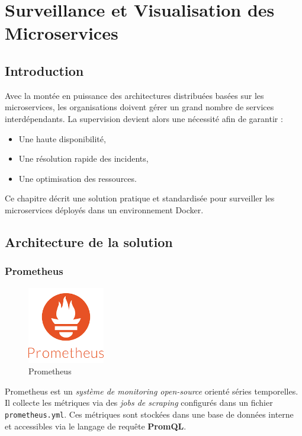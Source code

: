 \chapter{Surveillance et Visualisation des Microservices}
\label{chap:mesures}


\section{Introduction}
Avec la montée en puissance des architectures distribuées basées sur les microservices, les organisations doivent gérer un grand nombre de services interdépendants. La supervision devient alors une nécessité afin de garantir :
\begin{itemize}
     \item Une haute disponibilité,
    \item Une résolution rapide des incidents,
    \item Une optimisation des ressources.
\end{itemize}
Ce chapitre décrit une solution pratique et standardisée pour surveiller les microservices déployés dans un environnement Docker.

\section{Architecture de la solution}

\subsection{Prometheus}
\begin{figure}[H]
\centering
\includegraphics[width=0.3\textwidth]{images/prometheus.png}
\caption{Prometheus}
\label{fig:architecture-overview}
\end{figure}

Prometheus est un \textit{système de monitoring open-source} orienté séries temporelles. Il collecte les métriques via des \textit{jobs de scraping} configurés dans un fichier \texttt{prometheus.yml}. Ces métriques sont stockées dans une base de données interne et accessibles via le langage de requête \textbf{PromQL}.

